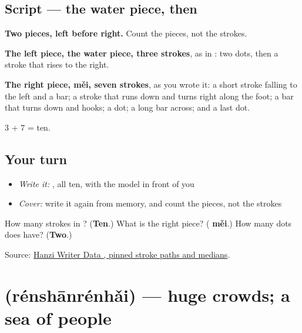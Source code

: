\subsection*{Script — the water piece, then }

\begin{quote}
\end{quote}

\textbf{Two pieces, left before right.} Count the pieces, not the strokes.

\textbf{The left piece, the water piece, three strokes}, as in : two dots, then a stroke that rises to the right.

\textbf{The right piece,  měi, seven strokes}, as you wrote it: a short stroke falling to the left and a bar; a stroke that runs down and turns right along the foot; a bar that turns down and hooks; a dot; a long bar across; and a last dot.

3 + 7 = ten.

\subsection*{Your turn}
\begin{itemize}
\raggedright
  \item \emph{Write it:} , all ten, with the model in front of you
  \item \emph{Cover:} write it again from memory, and count the pieces, not the strokes
\end{itemize}

\begin{tcolorbox}[breakable,colback=teal!4,colframe=teal!35!black,title={Before you move on}]
How many strokes in ? (\textbf{Ten}.) What is the right piece? (\textbf{ měi}.) How many dots does  have? (\textbf{Two}.)

Source: \href{https://raw.githubusercontent.com/chanind/hanzi-writer-data/68d10a4b21150cae5e1ebbd223eed289cf32d90c/data/\%E6\%B5\%B7.json}{Hanzi Writer Data , pinned stroke paths and medians}.
\end{tcolorbox}
\section[\texorpdfstring{\zh{人山人海} (rénshānrénhǎi)}{人山人海 (rénshānrénhǎi)}]{ (rénshānrénhǎi) — huge crowds; a sea of people}

